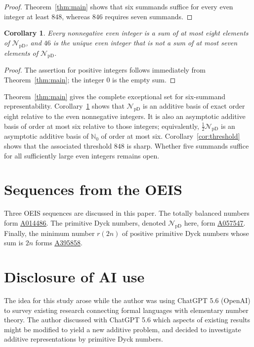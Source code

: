 \documentclass[12pt]{article}
\theoremstyle{plain}
\newtheorem{corollary}[theorem]{Corollary}
\newcommand{\NpD}{\mathcal{N}_{\mathrm{pD}}}
\newcommand{\seqnum}[1]{\href{https://oeis.org/#1}{\rm \underline{#1}}}
\begin{document}
\begin{proof}
Theorem~\ref{thm:main} shows that six summands suffice for every even
integer at least $848$, whereas $846$ requires seven summands.
\end{proof}

\begin{corollary}\label{cor:eight}
Every nonnegative even integer is a sum of at most eight elements of
$\NpD$, and $46$ is the unique even integer that is not a sum of at most
seven elements of $\NpD$.
\end{corollary}

\begin{proof}
The assertion for positive integers follows immediately from
Theorem~\ref{thm:main}; the integer $0$ is the empty sum.
\end{proof}

Theorem~\ref{thm:main} gives the complete exceptional set for
six-summand representability.  Corollary~\ref{cor:eight} shows that
$\NpD$ is an additive basis of exact order eight relative to the even
nonnegative integers.  It is also an asymptotic additive basis of order
at most six relative to those integers; equivalently, $\frac12\NpD$ is
an asymptotic additive basis of $\mathbb N_0$ of order at most six.
Corollary~\ref{cor:threshold} shows that the associated threshold $848$
is sharp.  Whether five summands suffice for all sufficiently large even
integers remains open.


\section{Sequences from the OEIS}\label{sec:oeis}

Three OEIS sequences are discussed in this paper.  The totally
balanced numbers form \seqnum{A014486}.  The primitive Dyck numbers,
denoted $\NpD$ here, form \seqnum{A057547}.  Finally, the minimum number
$r(2n)$ of positive primitive Dyck numbers whose sum is $2n$ forms
\seqnum{A395858}.

\section{Disclosure of AI use}\label{sec:AI}

The idea for this study arose while the author was using ChatGPT 5.6
(OpenAI) to survey existing research connecting formal languages with
elementary number theory. The author discussed with ChatGPT 5.6 which
aspects of existing results might be modified to yield a new additive
problem, and decided to investigate additive representations by
primitive Dyck numbers.
\end{document}
